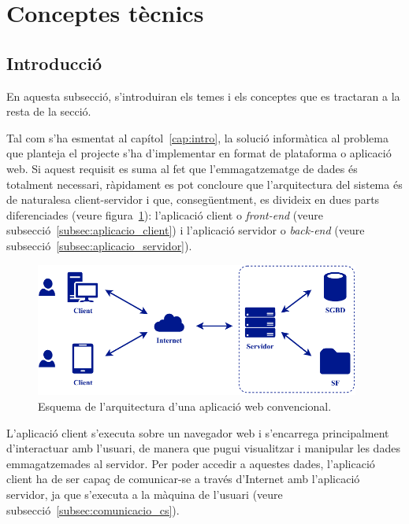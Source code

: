 \documentclass[a4paper,12pt]{ThesisStyle}
\begin{document}

\section{Conceptes tècnics}
\label{sec:conceptes_tecnics}

\subsection{Introducció}
\label{subsec:intro_conceptes_tecnics}

En aquesta subsecció, s'introduiran els temes i els conceptes que es tractaran a la resta de la secció.

Tal com s'ha esmentat al capítol~\ref{cap:intro}, la solució informàtica al problema que planteja el projecte s'ha d'implementar en format de plataforma o aplicació web. Si aquest requisit es suma al fet que l'emmagatzematge de dades és totalment necessari, ràpidament es pot concloure que l'arquitectura del sistema és de naturalesa client-servidor i que, consegüentment, es divideix en dues parts diferenciades (veure figura~\ref{img:esquema_web}): l'aplicació client o \textit{front-end} (veure subsecció~\ref{subsec:aplicacio_client}) i l'aplicació servidor o \textit{back-end} (veure subsecció~\ref{subsec:aplicacio_servidor}).

\begin{figure}[H]
  \centering
  \includegraphics[width=0.95\textwidth]{assets/figs/esquemaWeb.pdf}
  \caption{\label{img:esquema_web}Esquema de l'arquitectura d'una aplicació web convencional.}
\end{figure}

L'aplicació client s'executa sobre un navegador web i s'encarrega principalment d'interactuar amb l'usuari, de manera que pugui visualitzar i manipular les dades emmagatzemades al servidor. Per poder accedir a aquestes dades, l'aplicació client ha de ser capaç de comunicar-se a través d'Internet amb l'aplicació servidor, ja que s'executa a la màquina de l'usuari (veure subsecció~\ref{subsec:comunicacio_cs}).
\end{document}
